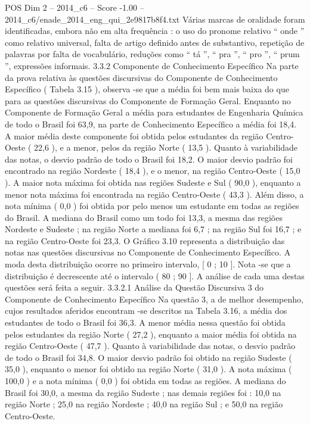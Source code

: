 \begin{textsample}{POS Dim 2 – 2014\_c6 – Score -1.00 – 2014\_c6/enade\_2014\_eng\_qui\_2e9817b8f4.txt}
Várias marcas de oralidade foram identificadas, embora não em alta frequência : o uso do pronome relativo “ onde ” como relativo universal, falta de artigo definido antes de substantivo, repetição de palavras por falta de vocabulário, reduções como “ tá ”, “ pra ”, “ pro ”, “ prum ”, expressões informais. 3.3.2 Componente de Conhecimento Específico Na parte da prova relativa às questões discursivas do Componente de Conhecimento Específico ( Tabela 3.15 ), observa -se que a média foi bem mais baixa do que para as questões discursivas do Componente de Formação Geral.
Enquanto no Componente de Formação Geral a média para estudantes de Engenharia Química de todo o Brasil foi 63,9, na parte de Conhecimento Específico a média foi 18,4.
A maior média deste componente foi obtida pelos estudantes da região Centro-Oeste ( 22,6 ), e a menor, pelos da região Norte ( 13,5 ).
Quanto à variabilidade das notas, o desvio padrão de todo o Brasil foi 18,2.
O maior desvio padrão foi encontrado na região Nordeste ( 18,4 ), e o menor, na região Centro-Oeste ( 15,0 ).
A maior nota máxima foi obtida nas regiões Sudeste e Sul ( 90,0 ), enquanto a menor nota máxima foi encontrada na região Centro-Oeste ( 43,3 ).
Além disso, a nota mínima ( 0,0 ) foi obtida por pelo menos um estudante em todas as regiões do Brasil.
A mediana do Brasil como um todo foi 13,3, a mesma das regiões Nordeste e Sudeste ; na região Norte a mediana foi 6,7 ; na região Sul foi 16,7 ; e na região Centro-Oeste foi 23,3.
O Gráfico 3.10 representa a distribuição das notas nas questões discursivas no Componente de Conhecimento Específico.
A moda desta distribuição ocorre no primeiro intervalo, [ 0 ; 10 ].
Nota -se que a distribuição é decrescente até o intervalo ( 80 ; 90 ].
A análise de cada uma destas questões será feita a seguir. 3.3.2.1 Análise da Questão Discursiva 3 do Componente de Conhecimento Específico Na questão 3, a de melhor desempenho, cujos resultados aferidos encontram -se descritos na Tabela 3.16, a média dos estudantes de todo o Brasil foi 36,3.
A menor média nessa questão foi obtida pelos estudantes da região Norte ( 27,2 ), enquanto a maior média foi obtida na região Centro-Oeste ( 47,7 ).
Quanto à variabilidade das notas, o desvio padrão de todo o Brasil foi 34,8.
O maior desvio padrão foi obtido na região Sudeste ( 35,0 ), enquanto o menor foi obtido na região Norte ( 31,0 ).
A nota máxima ( 100,0 ) e a nota mínima ( 0,0 ) foi obtida em todas as regiões.
A mediana do Brasil foi 30,0, a mesma da região Sudeste ; nas demais regiões foi : 10,0 na região Norte ; 25,0 na região Nordeste ; 40,0 na região Sul ; e 50,0 na região Centro-Oeste.

\end{textsample}
